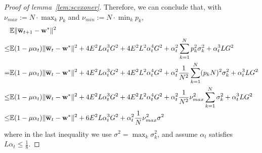 \begin{proof}[Proof of lemma~\ref{lem:scvxoner}]
	Therefore, we can conclude that, with $\nu_{max}:=N\cdot\max_{k}p_{k}$ and $\nu_{min}:=N\cdot\min_{k}p_{k}$, 
	\begin{align*}
	& \mathbb{E}\|{\overline{\mathbf{w}}}_{t+1}-{\mathbf{w}}^{\ast}\|^{2}\\
	\leq& \mathbb{E}(1-\mu\alpha_{t})\|{\overline{\mathbf{w}}}_{t}-{\mathbf{w}}^{\ast}\|^{2}+4E^{2}L\alpha_{t}^{3}G^{2}+4E^{2}L^{2}\alpha_{t}^{4}G^{2}+\alpha_{t}^{2}\sum_{k=1}^{N}p_{k}^{2}\sigma_{k}^{2}+\alpha_{t}^{3}LG^{2}\\
	= &\mathbb{E}(1-\mu\alpha_{t})\|{\overline{\mathbf{w}}}_{t}-{\mathbf{w}}^{\ast}\|^{2}+4E^{2}L\alpha_{t}^{3}G^{2}+4E^{2}L^{2}\alpha_{t}^{4}G^{2}+\alpha_{t}^{2}\frac{1}{N^{2}}\sum_{k=1}^{N}(p_{k}N)^{2}\sigma_{k}^{2}+\alpha_{t}^{3}LG^{2}\\
	\leq &\mathbb{E}(1-\mu\alpha_{t})\|{\overline{\mathbf{w}}}_{t}-{\mathbf{w}}^{\ast}\|^{2}+4E^{2}L\alpha_{t}^{3}G^{2}+4E^{2}L^{2}\alpha_{t}^{4}G^{2}+\alpha_{t}^{2}\frac{1}{N^{2}}\nu_{max}^{2}\sum_{k=1}^{N}\sigma_{k}^{2}+\alpha_{t}^{3}LG^{2}\\
	\leq &\mathbb{E}(1-\mu\alpha_{t})\|{\overline{\mathbf{w}}}_{t}-{\mathbf{w}}^{\ast}\|^{2}+6E^{2}L\alpha_{t}^{3}G^{2}+\alpha_{t}^{2}\frac{1}{N}\nu_{max}^{2}\sigma^{2}
	\end{align*}
	where in the last inequality we use $\sigma^{2}=\max_{k}\sigma_{k}^{2}$, and assume $\alpha_{t}$
	satisfies $L\alpha_{t}\leq\frac{1}{8}$. 

\end{proof}


